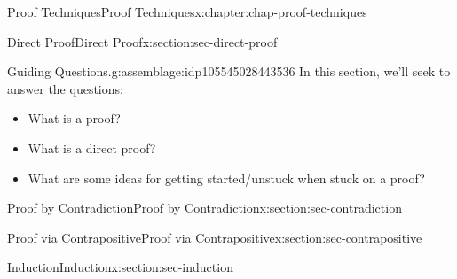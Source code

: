 \documentclass[oneside,10pt,]{book}
\begin{document}
\begin{chapterptx}{Proof Techniques}{}{Proof Techniques}{}{}{x:chapter:chap-proof-techniques}
%
%
\typeout{************************************************}
\typeout{************************************************}
%
\begin{sectionptx}{Direct Proof}{}{Direct Proof}{}{}{x:section:sec-direct-proof}
\begin{assemblage}{Guiding Questions.}{g:assemblage:idp105545028443536}%
In this section, we'll seek to answer the questions: %
\begin{itemize}[label=\textbullet]
\item{}What is a proof?%
\item{}What is a direct proof?%
\item{}What are some ideas for getting started\slash{}unstuck when stuck on a proof?%
\end{itemize}
%
\end{assemblage}
\end{sectionptx}
%
%
\typeout{************************************************}
\typeout{************************************************}
%
\begin{sectionptx}{Proof by Contradiction}{}{Proof by Contradiction}{}{}{x:section:sec-contradiction}
\end{sectionptx}
%
%
\typeout{************************************************}
\typeout{************************************************}
%
\begin{sectionptx}{Proof via Contrapositive}{}{Proof via Contrapositive}{}{}{x:section:sec-contrapositive}
\end{sectionptx}
%
%
\typeout{************************************************}
\typeout{************************************************}
%
\begin{sectionptx}{Induction}{}{Induction}{}{}{x:section:sec-induction}
\end{sectionptx}
\end{chapterptx}
%
%
\typeout{************************************************}
\typeout{************************************************}
%
\end{document}
